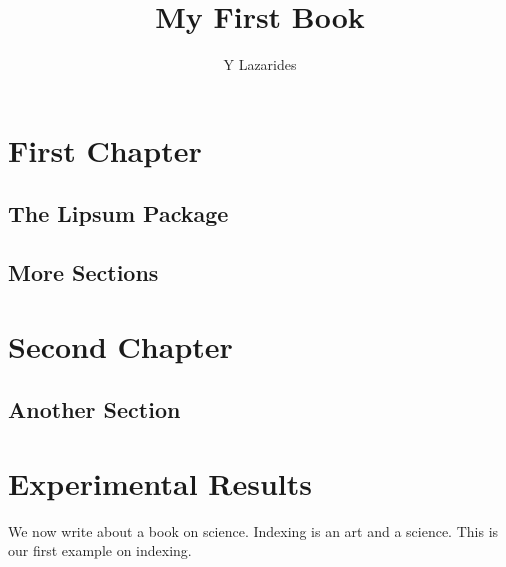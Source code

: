 \documentclass{book}
\title{My First Book}
\author{Y Lazarides}
\begin{document}
\maketitle
\tableofcontents
\chapter{First Chapter}
\section{The Lipsum Package}
\lipsum[1-30]
\section{More Sections}
\lipsum

\chapter{Second Chapter}
\section{Another Section}
\lipsum
\appendix
\chapter{Experimental Results}
We now write about a book on science. Indexing is an
art and a science. This is our first example on indexing.

\printindex
\end{document}
